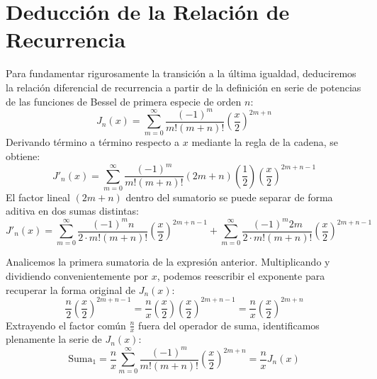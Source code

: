 \documentclass[11pt,a4paper]{article}
\begin{document}
\section{Deducción de la Relación de Recurrencia}
Para fundamentar rigurosamente la transición a la última igualdad, deduciremos la relación diferencial de recurrencia a partir de la definición en serie de potencias de las funciones de Bessel de primera especie de orden $n$:
\begin{equation}
	J_n(x) = \sum_{m=0}^{\infty} \frac{(-1)^m}{m!(m+n)!} \left(\frac{x}{2}\right)^{2m+n}
\end{equation}
Derivando término a término respecto a $x$ mediante la regla de la cadena, se obtiene:
\begin{equation}
	J'_n(x) = \sum_{m=0}^{\infty} \frac{(-1)^m}{m!(m+n)!} (2m+n) \left( \frac{1}{2} \right) \left(\frac{x}{2}\right)^{2m+n-1}
\end{equation}
El factor lineal $(2m+n)$ dentro del sumatorio se puede separar de forma aditiva en dos sumas distintas:
\begin{equation}
	J'_n(x) = \sum_{m=0}^{\infty} \frac{(-1)^m n}{2 \cdot m!(m+n)!} \left(\frac{x}{2}\right)^{2m+n-1} + \sum_{m=0}^{\infty} \frac{(-1)^m 2m}{2 \cdot m!(m+n)!} \left(\frac{x}{2}\right)^{2m+n-1}
\end{equation}

Analicemos la primera sumatoria de la expresión anterior. Multiplicando y dividiendo convenientemente por $x$, podemos reescribir el exponente para recuperar la forma original de $J_n(x)$:
\begin{equation}
	\frac{n}{2} \left(\frac{x}{2}\right)^{2m+n-1} = \frac{n}{x} \left(\frac{x}{2}\right) \left(\frac{x}{2}\right)^{2m+n-1} = \frac{n}{x} \left(\frac{x}{2}\right)^{2m+n}
\end{equation}
Extrayendo el factor común $\frac{n}{x}$ fuera del operador de suma, identificamos plenamente la serie de $J_n(x)$:
\begin{equation}
	\text{Suma}_1 = \frac{n}{x} \sum_{m=0}^{\infty} \frac{(-1)^m}{m!(m+n)!} \left(\frac{x}{2}\right)^{2m+n} = \frac{n}{x} J_n(x)
\end{equation}
\end{document}

